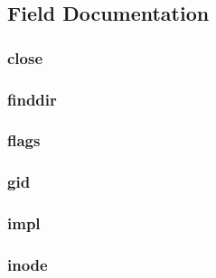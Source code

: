 \subsection{Field Documentation}
\hypertarget{structnode_aa53bc19f51782a3a27defe2d22e1bd0d}{
\subsubsection[{close}]{ {\bf close}}}
\label{structnode_aa53bc19f51782a3a27defe2d22e1bd0d}
\hypertarget{structnode_a1721355afe8d778d82355f2b29ee5f8e}{
\subsubsection[{finddir}]{ {\bf finddir}}}
\label{structnode_a1721355afe8d778d82355f2b29ee5f8e}
\hypertarget{structnode_a3c67431132e70c431fbfc3bf03a63dd4}{
\subsubsection[{flags}]{ {\bf flags}}}
\label{structnode_a3c67431132e70c431fbfc3bf03a63dd4}
\hypertarget{structnode_adc4a5165896c5347e088f15bc93ff8dc}{
\subsubsection[{gid}]{ {\bf gid}}}
\label{structnode_adc4a5165896c5347e088f15bc93ff8dc}
\hypertarget{structnode_ae55321901d1853c575f21b4e7256ede6}{
\subsubsection[{impl}]{ {\bf impl}}}
\label{structnode_ae55321901d1853c575f21b4e7256ede6}
\hypertarget{structnode_a1ea843802457b0d31c6d2d2d5c662077}{
\subsubsection[{inode}]{ {\bf inode}}}
